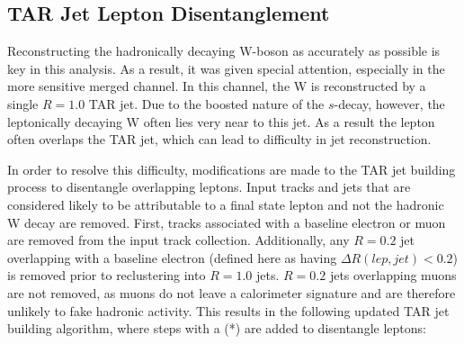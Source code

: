 \subsection{TAR Jet Lepton Disentanglement}
Reconstructing the hadronically decaying W-boson as accurately as possible is key in this analysis. As a result, it was given special attention, especially in the more sensitive merged channel. In this channel, the W is reconstructed by a single $R=1.0$ TAR jet. Due to the boosted nature of the $s$-decay, however, the leptonically decaying W often lies very near to this jet. As a result the lepton often overlaps the TAR jet, which can lead to difficulty in jet reconstruction.

In order to resolve this difficulty, modifications are made to the TAR jet building process to disentangle overlapping leptons. Input tracks and jets that are considered likely to be attributable to a final state lepton and not the hadronic W decay are removed. First, tracks associated with a baseline electron or muon are removed from the input track collection. Additionally, any \akt $R=0.2$ jet overlapping with a baseline electron (defined here as having $\Delta R(lep,jet) < 0.2$) is removed prior to reclustering into $R=1.0$ jets. $R=0.2$ jets overlapping muons are not removed, as muons do not leave a calorimeter signature and are therefore unlikely to fake hadronic activity. This results in the following updated TAR jet building algorithm, where steps with a (*) are added to disentangle leptons:

